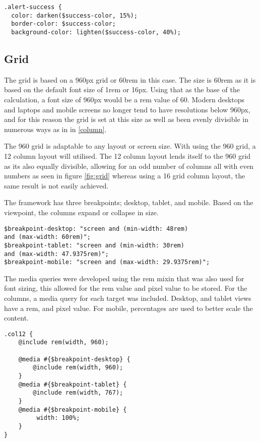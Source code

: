 \begin{lstlisting}[language=CSS3]
.alert-success {
  color: darken($success-color, 15%);
  border-color: $success-color;
  background-color: lighten($success-color, 40%);
\end{lstlisting}

\newpage
\subsection*{Grid}

The grid is based on a 960px grid or 60rem in this case. The size is 60rem as it is based on the default font size of 1rem or 16px. Using that as the base of the calculation, a font size of 960px would be a \gls{rem} value of 60. Modern desktops and laptops and mobile screens no longer tend to have resolutions below 960px, and for this reason the grid is set at this size as well as been evenly divisible in numerous ways as in in \ref{column}. 

The 960 grid is adaptable to any layout or screen size. With using the 960 grid, a 12 column layout will utilised. The 12 column layout lends itself to the 960 grid as its also equally divisible, allowing for an odd number of columns all with even numbers as seen in figure \ref{fig:grid} whereas using a 16 grid column layout, the same result is not easily achieved. 

The framework has three breakpoints; desktop, tablet, and mobile. Based on the viewpoint, the columns expand or collapse in size. 

\begin{lstlisting}[language=CSS3]
$breakpoint-desktop: "screen and (min-width: 48rem) 
and (max-width: 60rem)";
$breakpoint-tablet: "screen and (min-width: 30rem) 
and (max-width: 47.9375rem)";
$breakpoint-mobile: "screen and (max-width: 29.9375rem)";
\end{lstlisting}

The media queries were developed using the rem mixin that was also used for font sizing, this allowed for the rem value and pixel value to be stored. For the columns, a media query for each target was included. Desktop, and tablet views have a rem, and pixel value. For mobile, percentages are used to better scale the content.

\newpage
\begin{lstlisting}[language=CSS3]
.col12 {
	@include rem(width, 960);

	@media #{$breakpoint-desktop} {
		@include rem(width, 960);
	}
	@media #{$breakpoint-tablet} {
		@include rem(width, 767);
	}
	@media #{$breakpoint-mobile} {
		 width: 100%;
	}
}
\end{lstlisting}

